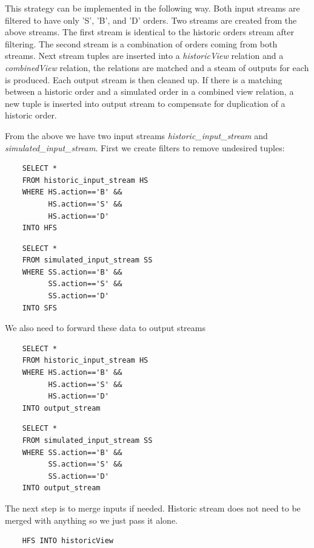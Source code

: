 \documentclass{article}
\begin{document}
This strategy can be implemented in the following way. Both input streams are filtered to have only 'S', 'B', and 'D' orders. Two streams are created from the above streams. The first stream is identical to the historic orders stream after filtering. The second stream is a combination of orders coming from both streams. Next stream tuples are inserted into a \emph{historicView} relation and a \emph{combinedView} relation, the relations are matched and a steam of outputs for each is produced. Each output stream is then cleaned up. If there is a matching between a historic order and a simulated order in a combined view relation, a new tuple is inserted into output stream to compensate for duplication of a historic order.

From the above we have two input streams \emph{historic\_input\_stream} and \emph{simulated\_input\_stream}. First we create filters to remove undesired tuples:

\begin{verbatim}   
    SELECT * 
    FROM historic_input_stream HS
    WHERE HS.action=='B' &&
          HS.action=='S' &&
          HS.action=='D'
    INTO HFS
\end{verbatim}

\begin{verbatim}  
    SELECT *
    FROM simulated_input_stream SS
    WHERE SS.action=='B' &&
          SS.action=='S' &&
          SS.action=='D'
    INTO SFS
\end{verbatim}

\noindent We also need to forward these data to output streams

\begin{verbatim}   
    SELECT * 
    FROM historic_input_stream HS
    WHERE HS.action=='B' &&
          HS.action=='S' &&
          HS.action=='D'
    INTO output_stream
\end{verbatim}

\begin{verbatim}  
    SELECT *
    FROM simulated_input_stream SS
    WHERE SS.action=='B' &&
          SS.action=='S' &&
          SS.action=='D'
    INTO output_stream
\end{verbatim}

\noindent The next step is to merge inputs if needed. Historic stream does not need to be merged with anything so we just pass it alone. 

\begin{verbatim} 
    HFS INTO historicView
\end{verbatim}
\end{document}
